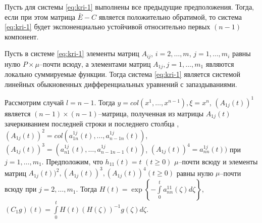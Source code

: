 \begin{statement}\label{st:kri-1}
    Пусть для системы \eqref{eq:kri-1} выполнены все
    предыдущие предположения. Тогда, если при этом матрица $\bar E - C$
    является положительно обратимой, то система \eqref{eq:kri-1} будет
    экспоненциально устойчивой относительно первых $(n-1)$ компонент.
\end{statement}

Пусть в системе \eqref{eq:kri-1} элементы матриц $A_{ij}$, $i = 2, \dots, m$, $j = 1, \dots, m_i$ равны нулю $P\times\mu$--почти всюду, а элементами матриц
$A_{1j}, j = 1, \dots, m_1$ являются локально суммируемые функции.
Тогда система \eqref{eq:kri-1} является системой линейных обыкновенных
дифференциальных уравнений с запаздываниями.

Рассмотрим случай  $l = n-1$. Тогда $y = col(x^1,\dots,x^{n-1}), \xi =
x^n$, $(A_{1j}(t))^1$ является $(n-1)\times (n-1)$--матрица,
полученная из матрицы $A_{1j}(t)$ зачеркиванием последней строки и
последнего столбца , $(A_{1j}(t))^2 =
col(a^{1j}_{1n}(t),...,a^{1j}_{n-1 n}(t))$, $(A_{1j}(t))^3 =
(a^{1j}_{n1}(t),\dots,a^{1j}_{n-1n-1}(t))$, $(A_{1j}(t))^4 =
a^{1j}_{nn}(t))$ при $j = 1,\dots,m_1 $. Предположим, что $h_{11}(t) =
t$ $(t \geq 0)$ $\mu $--почти всюду и элементы матриц
$A_{1j}(t))^2, (A_{1j}(t))^3, (A_{1j}(t))^4 (t \geq 0)$ равны нулю
$\mu $--почти всюду при $j = 2,\dots,m_1 $. Тогда $H(t) = \exp \left
\{-\int \limits _{0}^t a^{11}_{nn}(\zeta)d\zeta \right \}$,
$(C_1g)(t) = \int \limits _{0}^tH(t)(H(\zeta))^{-1}g(\zeta)d\zeta$.


